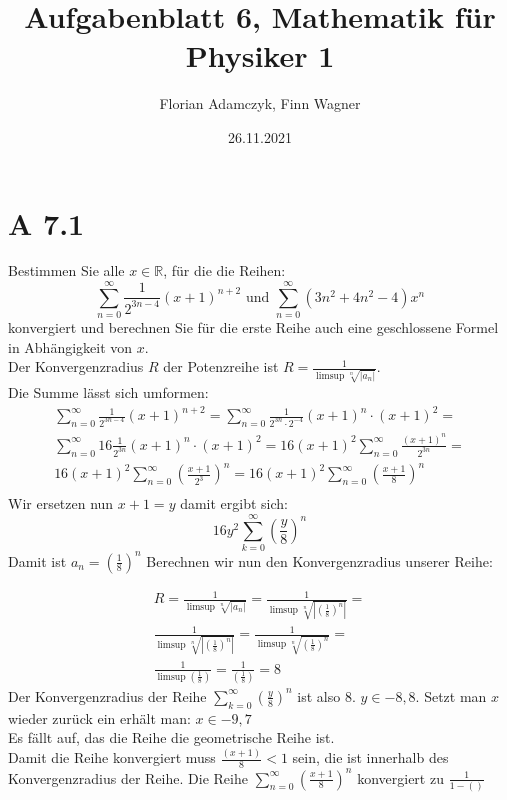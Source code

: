 \documentclass{article}
\date{26.11.2021}
\title{Aufgabenblatt 6, Mathematik für Physiker 1}
\author{Florian Adamczyk, Finn Wagner}
\begin{document}
    \maketitle

    \section*{A 7.1}
    Bestimmen Sie alle \(x \in \mathbb{R}\), für die die Reihen:
    \[
        \sum_{n=0}^{\infty} \frac{1}{2^{3n-4}} {(x+1)}^{n+2} \text{ und } \sum_{n=0}^{\infty} (3n^2 + 4n^2 -4)x^n
    \]
    konvergiert und berechnen Sie für die erste Reihe auch eine geschlossene Formel in
    Abhängigkeit von \(x\). \\

    Der Konvergenzradius \(R\) der Potenzreihe ist \(R = \frac{1}{ \limsup \sqrt[n]{|a_n|} } \). \\
    Die Summe lässt sich umformen:
    \begin{gather*}
        \sum_{n=0}^{\infty} \frac{1}{2^{3n-4}} {(x+1)}^{n+2} = \sum_{n=0}^{\infty} \frac{1}{2^{3n} \cdot 2^{-4}} {(x+1)}^{n} \cdot {(x+1)}^{2}  = \\
        \sum_{n=0}^{\infty} 16 \frac{1}{2^{3n}} {(x+1)}^{n} \cdot {(x+1)}^{2} = 16 {(x+1)}^{2} \sum_{n=0}^{\infty} \frac{ {(x+1)}^{n} }{2^{3n}} = \\
        16 {(x+1)}^{2} \sum_{n=0}^{\infty} {\left( \frac{ {x+1} }{2^3} \right)}^n = 16 {(x+1)}^{2} \sum_{n=0}^{\infty} {\left( \frac{ {x+1} }{8} \right)}^n\\
    \end{gather*}
    Wir ersetzen nun \(x + 1 = y\) damit ergibt sich:
    \[16y^2 \sum_{k=0}^{\infty} { \left( \frac{y}{8} \right) }^n \]
    Damit ist \( a_n = { \left( \frac{1}{8} \right) }^n \)
    Berechnen wir nun den Konvergenzradius unserer Reihe:
    
    \begin{gather*}
        R = \frac{1}{ \limsup \sqrt[n]{|a_n|} } = \frac{1}{ \limsup \sqrt[n]{ \left| { \left( \frac{1}{8} \right) }^n \right| } } = \\
        \frac{1}{ \limsup \sqrt[n]{ \left| { \left( \frac{1}{8} \right) }^n \right| } } = \frac{1}{ \limsup \sqrt[n]{ { \left( \frac{1}{8} \right) }^n } } = \\
        \frac{1}{ \limsup \left( \frac{1}{8} \right) } = \frac{1}{ \left( \frac{1}{8} \right) } = 8
    \end{gather*}
    Der Konvergenzradius der Reihe \(\sum_{k=0}^{\infty} { \left( \frac{y}{8} \right) }^n\) ist also 8. \(y \in {-8, 8}\).
    Setzt man \(x\) wieder zurück ein erhält man: \(x \in {-9, 7} \) \\
    Es fällt auf, das die Reihe die geometrische Reihe ist. \\
    Damit die Reihe konvergiert muss \(\frac{(x+1)}{8} < 1\) sein, die ist innerhalb des Konvergenzradius der Reihe.
    Die Reihe \(\sum_{n=0}^{\infty} {\left( \frac{ {x+1} }{8} \right)}^n\) konvergiert zu \( \frac{1}{1 - \left(\right) } \)
\end{document}
